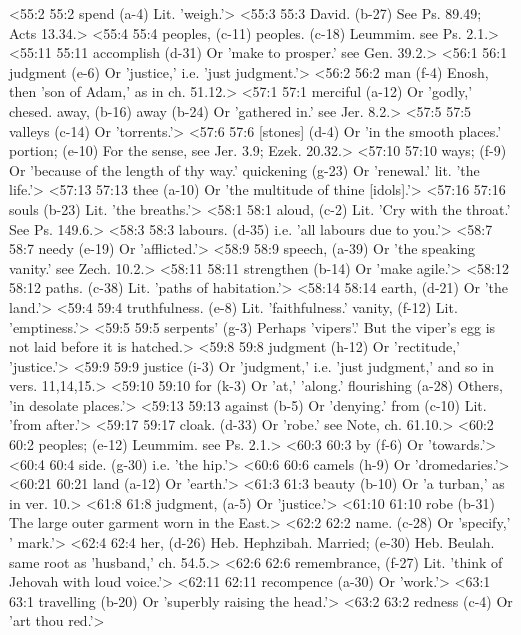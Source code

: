 <55:2 55:2  spend (a-4)  Lit. 'weigh.'>
<55:3 55:3  David. (b-27)  See Ps. 89.49; Acts 13.34.>
<55:4 55:4  peoples, (c-11)  peoples. (c-18)
  Leummim. see Ps. 2.1.>
<55:11 55:11  accomplish (d-31)  Or 'make to prosper.' see Gen. 39.2.>
<56:1 56:1  judgment (e-6)  Or 'justice,' i.e. 'just judgment.'>
<56:2 56:2  man (f-4)  Enosh, then 'son of Adam,' as in ch. 51.12.>
<57:1 57:1  merciful (a-12)  Or 'godly,' chesed.
  away, (b-16)  away (b-24)
  Or 'gathered in.' see Jer. 8.2.>
<57:5 57:5  valleys (c-14)  Or 'torrents.'>
<57:6 57:6  [stones] (d-4)  Or 'in the smooth places.'
  portion; (e-10)  For the sense, see Jer. 3.9; Ezek. 20.32.>
<57:10 57:10  ways; (f-9)  Or 'because of the length of thy way.'
  quickening (g-23)  Or 'renewal.' lit. 'the life.'>
<57:13 57:13  thee (a-10)  Or 'the multitude of thine [idols].'>
<57:16 57:16  souls (b-23)  Lit. 'the breaths.'>
<58:1 58:1  aloud, (c-2)  Lit. 'Cry with the throat.' See Ps. 149.6.>
<58:3 58:3  labours. (d-35)  i.e. 'all labours due to you.'>
<58:7 58:7  needy (e-19)  Or 'afflicted.'>
<58:9 58:9  speech, (a-39)  Or 'the speaking vanity.' see Zech. 10.2.>
<58:11 58:11  strengthen (b-14)  Or 'make agile.'>
<58:12 58:12  paths. (c-38)  Lit. 'paths of habitation.'>
<58:14 58:14  earth, (d-21)  Or 'the land.'>
<59:4 59:4  truthfulness. (e-8)  Lit. 'faithfulness.'
  vanity, (f-12)  Lit. 'emptiness.'>
<59:5 59:5  serpents' (g-3)  Perhaps 'vipers'.' But the viper's egg is not laid before it  is hatched.>
<59:8 59:8  judgment (h-12)  Or 'rectitude,' 'justice.'>
<59:9 59:9  justice (i-3)  Or 'judgment,' i.e. 'just judgment,' and so in vers. 11,14,15.>
<59:10 59:10  for (k-3)  Or 'at,' 'along.'
  flourishing (a-28)  Others, 'in desolate places.'>
<59:13 59:13  against (b-5)  Or 'denying.'
  from (c-10)  Lit. 'from after.'>
<59:17 59:17  cloak. (d-33)  Or 'robe.' see Note, ch. 61.10.>
<60:2 60:2  peoples; (e-12)  Leummim. see Ps. 2.1.>
<60:3 60:3  by (f-6)  Or 'towards.'>
<60:4 60:4  side. (g-30)  i.e. 'the hip.'>
<60:6 60:6  camels (h-9)  Or 'dromedaries.'>
<60:21 60:21  land (a-12)  Or 'earth.'>
<61:3 61:3  beauty (b-10)  Or 'a turban,' as in ver. 10.>
<61:8 61:8  judgment, (a-5)  Or 'justice.'>
<61:10 61:10  robe (b-31)  The large outer garment worn in the East.>
<62:2 62:2  name. (c-28)  Or 'specify,' ' mark.'>
<62:4 62:4  her, (d-26)  Heb. Hephzibah.
  Married; (e-30)  Heb. Beulah. same root as 'husband,' ch. 54.5.>
<62:6 62:6  remembrance, (f-27)  Lit. 'think of Jehovah with loud voice.'>
<62:11 62:11  recompence (a-30)  Or 'work.'>
<63:1 63:1  travelling (b-20)  Or 'superbly raising the head.'>
<63:2 63:2  redness (c-4)  Or 'art thou red.'>
